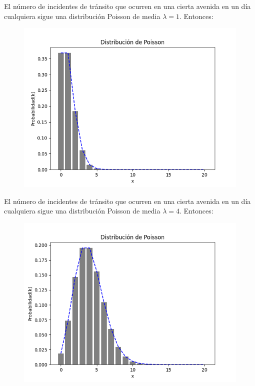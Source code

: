 El número de incidentes de tránsito que ocurren en una cierta avenida en un día
cualquiera sigue una distribución Poisson de media $\lambda=1$. Entonces:

  \begin{figure}
    \centering
    \includegraphics[scale=0.9]{../slides/figures/poisson_distribution_lambda_1.png}
  \end{figure}

El número de incidentes de tránsito que ocurren en una cierta avenida en un día
cualquiera sigue una distribución Poisson de media $\lambda=4$. Entonces:

  \begin{figure}
    \centering
    \includegraphics[scale=0.9]{../slides/figures/poisson_distribution_lambda_4.png}
  \end{figure}

